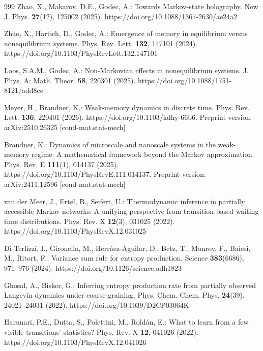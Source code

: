 \begin{thebibliography}{999}
Zhao, X., Makarov, D.E., Godec, A.: Towards Markov-state holography. New J. Phys. \textbf{27}(12), 125002 (2025). https://doi.org/10.1088/1367-2630/ae24a2

Zhao, X., Hartich, D., Godec, A.: Emergence of memory in equilibrium versus
nonequilibrium systems. Phys. Rev. Lett. \textbf{132}, 147101 (2024).
https://doi.org/10.1103/PhysRevLett.132.147101

Loos, S.A.M., Godec, A.: Non-Markovian effects in nonequilibrium systems. J. Phys. A: Math. Theor. \textbf{58}, 220301 (2025). https://doi.org/10.1088/1751-8121/add8ce

Meyer, H., Brandner, K.: Weak-memory dynamics in discrete time. Phys. Rev. Lett. \textbf{136}, 220401 (2026). https://doi.org/10.1103/kdhy-66b6. Preprint version: arXiv:2510.26325 [cond-mat.stat-mech]

Brandner, K.: Dynamics of microscale and nanoscale systems in the weak-memory regime: A mathematical framework beyond the Markov approximation. Phys. Rev. E \textbf{111}(1), 014137 (2025). https://doi.org/10.1103/PhysRevE.111.014137. Preprint version: arXiv:2411.12596 [cond-mat.stat-mech]

van der Meer, J., Ertel, B., Seifert, U.: Thermodynamic inference in partially accessible Markov networks: A unifying perspective from transition-based waiting time distributions. Phys. Rev. X \textbf{12}(3), 031025 (2022). https://doi.org/10.1103/PhysRevX.12.031025

Di Terlizzi, I., Gironella, M., Herr\'aez-Aguilar, D., Betz, T., Monroy, F.,
Baiesi, M., Ritort, F.: Variance sum rule for entropy production. Science
\textbf{383}(6686), 971--976 (2024). https://doi.org/10.1126/science.adh1823

Ghosal, A., Bisker, G.: Inferring entropy production rate from partially
observed Langevin dynamics under coarse-graining. Phys. Chem. Chem. Phys.
\textbf{24}(39), 24021--24031 (2022).
https://doi.org/10.1039/D2CP03064K

Harunari, P.E., Dutta, S., Polettini, M., Rold\'an, E.: What to learn from a few visible transitions' statistics? Phys. Rev. X \textbf{12}, 041026 (2022). https://doi.org/10.1103/PhysRevX.12.041026


\end{thebibliography}
